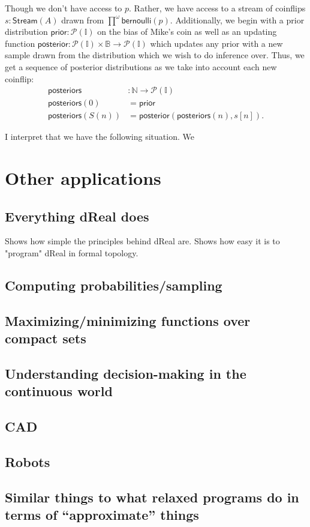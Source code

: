 \documentclass{article}           %
\newcommand{\nat}{\mathbb{N}}
\newcommand{\bool}{\mathbb{B}}
\newcommand{\Prob}{\mathcal{P}}
\begin{document}
Though we don't have access to $p$. Rather, we have access to a stream of coinflips $s : \mathsf{Stream}(A)$ drawn from $\prod^\omega \mathsf{bernoulli}(p)$. Additionally, we begin with a prior distribution $\mathsf{prior} : \Prob(\mathbb{I})$ on the bias of Mike's coin as well as an updating function $\mathsf{posterior} : \Prob(\mathbb{I}) \times \bool \to \Prob(\mathbb{I})$ which updates any prior with a new sample drawn from the distribution which we wish to do inference over. Thus, we get a sequence of posterior distributions as we take into account each new coinflip:
\begin{align*}
\mathsf{posteriors} &: \nat \to \Prob(\mathbb{I})
\\ \mathsf{posteriors}(0) &= \mathsf{prior}
\\ \mathsf{posteriors}(S(n)) &= \mathsf{posterior}(\mathsf{posteriors}(n), s[n]).
\end{align*}

I interpret that we have the following situation. We 

\section{Other applications}

\subsection{Everything dReal does}
Shows how simple the principles behind dReal are. Shows how easy it is to "program" dReal in formal topology. 

\subsection{Computing probabilities/sampling}
\subsection{Maximizing/minimizing functions over compact sets}
\subsection{Understanding decision-making in the continuous world}
\subsection{CAD}
\subsection{Robots}
\subsection{Similar things to what relaxed programs do in terms of ``approximate'' things}




\end{document}
